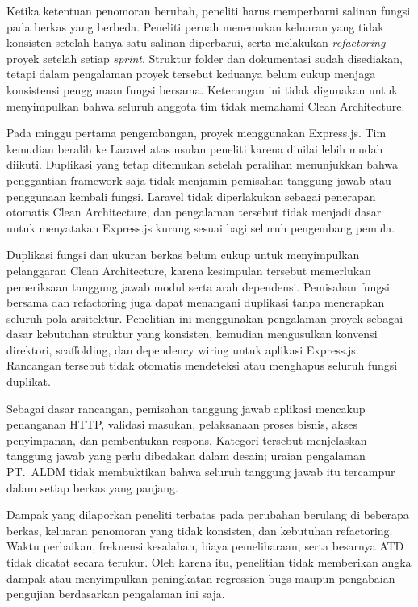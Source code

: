 \documentclass[12pt,a4paper,oneside]{report}
\begin{document}
Ketika ketentuan penomoran berubah, peneliti harus memperbarui salinan fungsi pada berkas yang berbeda. Peneliti pernah menemukan keluaran yang tidak konsisten setelah hanya satu salinan diperbarui, serta melakukan \textit{refactoring} proyek setelah setiap \textit{sprint}. Struktur folder dan dokumentasi sudah disediakan, tetapi dalam pengalaman proyek tersebut keduanya belum cukup menjaga konsistensi penggunaan fungsi bersama. Keterangan ini tidak digunakan untuk menyimpulkan bahwa seluruh anggota tim tidak memahami Clean Architecture.

Pada minggu pertama pengembangan, proyek menggunakan Express.js. Tim kemudian beralih ke Laravel atas usulan peneliti karena dinilai lebih mudah diikuti. Duplikasi yang tetap ditemukan setelah peralihan menunjukkan bahwa penggantian framework saja tidak menjamin pemisahan tanggung jawab atau penggunaan kembali fungsi. Laravel tidak diperlakukan sebagai penerapan otomatis Clean Architecture, dan pengalaman tersebut tidak menjadi dasar untuk menyatakan Express.js kurang sesuai bagi seluruh pengembang pemula.

Duplikasi fungsi dan ukuran berkas belum cukup untuk menyimpulkan pelanggaran Clean Architecture, karena kesimpulan tersebut memerlukan pemeriksaan tanggung jawab modul serta arah dependensi. Pemisahan fungsi bersama dan refactoring juga dapat menangani duplikasi tanpa menerapkan seluruh pola arsitektur. Penelitian ini menggunakan pengalaman proyek sebagai dasar kebutuhan struktur yang konsisten, kemudian mengusulkan konvensi direktori, scaffolding, dan dependency wiring untuk aplikasi Express.js. Rancangan tersebut tidak otomatis mendeteksi atau menghapus seluruh fungsi duplikat.

Sebagai dasar rancangan, pemisahan tanggung jawab aplikasi mencakup penanganan HTTP, validasi masukan, pelaksanaan proses bisnis, akses penyimpanan, dan pembentukan respons. Kategori tersebut menjelaskan tanggung jawab yang perlu dibedakan dalam desain; uraian pengalaman PT.\ ALDM tidak membuktikan bahwa seluruh tanggung jawab itu tercampur dalam setiap berkas yang panjang.

Dampak yang dilaporkan peneliti terbatas pada perubahan berulang di beberapa berkas, keluaran penomoran yang tidak konsisten, dan kebutuhan refactoring. Waktu perbaikan, frekuensi kesalahan, biaya pemeliharaan, serta besarnya ATD tidak dicatat secara terukur. Oleh karena itu, penelitian tidak memberikan angka dampak atau menyimpulkan peningkatan regression bugs maupun pengabaian pengujian berdasarkan pengalaman ini saja.
\end{document}
